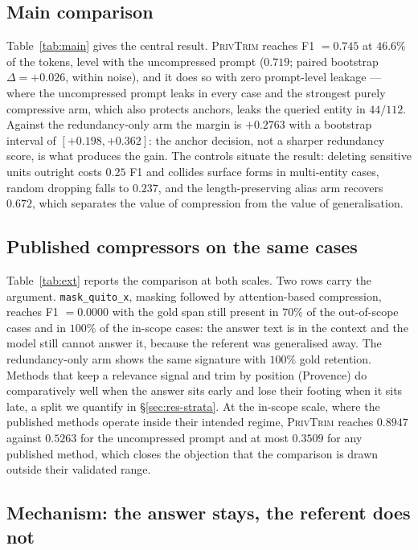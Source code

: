 \documentclass[conference]{IEEEtran}
\newcommand{\ours}{\textsc{PrivTrim}}
\newcommand{\arm}[1]{\texttt{#1}}
\newcommand{\delt}{\ensuremath{\Delta}}
\begin{document}


\subsection{Main comparison}
\label{sec:res-main}

Table~\ref{tab:main} gives the central result. \ours{} reaches F1 $=0.745$ at $46.6\%$ of the
tokens, level with the uncompressed prompt ($0.719$; paired bootstrap $\delt=+0.026$, within
noise), and it does so with zero prompt-level leakage --- where the uncompressed prompt leaks
in every case and the strongest purely compressive arm, which also protects anchors, leaks the
queried entity in $44/112$. Against the redundancy-only arm the margin is $+0.2763$ with a
bootstrap interval of $[+0.198,+0.362]$: the anchor decision, not a sharper redundancy score,
is what produces the gain. The controls situate the result: deleting sensitive units outright
costs $0.25$ F1 and collides surface forms in multi-entity cases, random dropping falls to
$0.237$, and the length-preserving alias arm recovers $0.672$, which separates the value of
compression from the value of generalisation.

\subsection{Published compressors on the same cases}
\label{sec:res-ext}

Table~\ref{tab:ext} reports the comparison at both scales. Two rows carry the argument.
\arm{mask\_quito\_x}, masking followed by attention-based compression, reaches F1 $=0.0000$
with the gold span still present in $70\%$ of the out-of-scope cases and in $100\%$ of the
in-scope cases: the answer text is in the context and the model still cannot answer it, because
the referent was generalised away. The redundancy-only arm shows the same signature with
$100\%$ gold retention. Methods that keep a relevance signal and trim by position (Provence)
do comparatively well when the answer sits early and lose their footing when it sits late, a
split we quantify in \S\ref{sec:res-strata}. At the in-scope scale, where the published methods
operate inside their intended regime, \ours{} reaches $0.8947$ against $0.5263$ for the
uncompressed prompt and at most $0.3509$ for any published method, which closes the objection
that the comparison is drawn outside their validated range.

\subsection{Mechanism: the answer stays, the referent does not}
\label{sec:res-mech}
\end{document}
